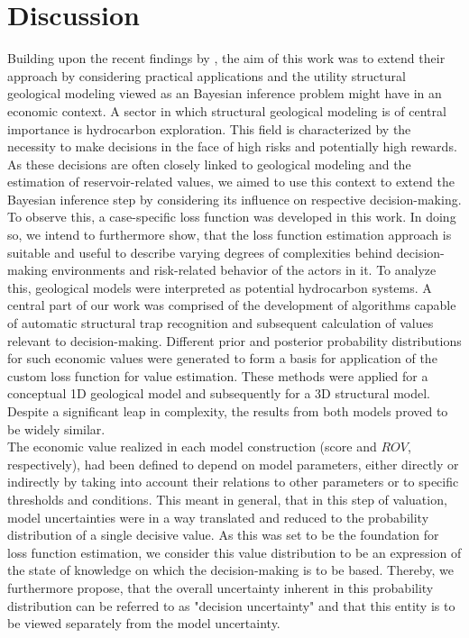 	\chapter{Discussion}\label{cha:discussion}
	Building upon the recent findings by \citet{delaVarga2016}, the aim of this work was to extend their approach by considering practical applications and the utility structural geological modeling viewed as an Bayesian inference problem might have in an economic context. A sector in which structural geological modeling is of central importance is hydrocarbon exploration. This field is characterized by the necessity to make decisions in the face of high risks and potentially high rewards. As these decisions are often closely linked to geological modeling and the estimation of reservoir-related values, we aimed to use this context to extend the Bayesian inference step by considering its influence on respective decision-making. To observe this, a case-specific loss function was developed in this work. In doing so, we intend to furthermore show, that the loss function estimation approach is suitable and useful to describe varying degrees of complexities behind decision-making environments and risk-related behavior of the actors in it.
	To analyze this, geological models were interpreted as potential hydrocarbon systems. A central part of our work was comprised of the development of algorithms capable of automatic structural trap recognition and subsequent calculation of values relevant to decision-making. Different prior and posterior probability distributions for such economic values were generated to form a basis for application of the custom loss function for value estimation. These methods were applied for a conceptual 1D geological model and subsequently for a 3D structural model. 
	Despite a significant leap in complexity, the results from both models proved to be widely similar.\\	
	The economic value realized in each model construction (score and $ROV$, respectively), had been defined to depend on model parameters, either directly or indirectly by taking into account their relations to other parameters or to specific thresholds and conditions. This meant in general, that in this step of valuation, model uncertainties were in a way translated and reduced to the probability distribution of a single decisive value. As this was set to be the foundation for loss function estimation, we consider this value distribution to be an expression of the state of knowledge on which the decision-making is to be based. Thereby, we furthermore propose, that the overall uncertainty inherent in this probability distribution can be referred to as "decision uncertainty" and that this entity is to be viewed separately from the model uncertainty.\\	
